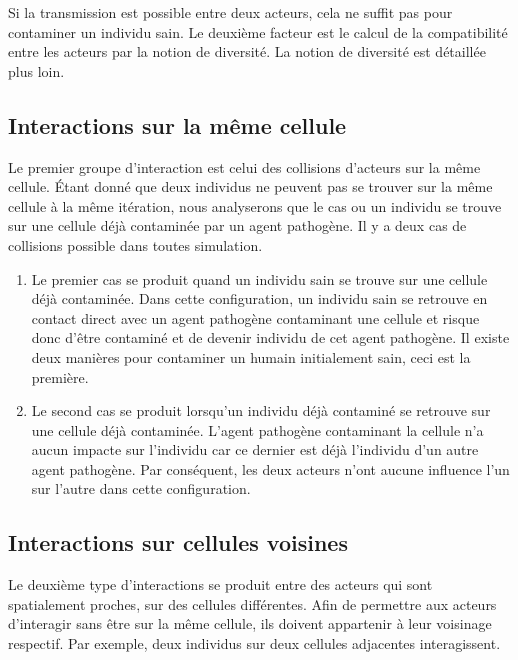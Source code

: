 Si la transmission est possible entre deux acteurs, cela ne suffit pas pour contaminer un individu sain. Le deuxième facteur est le calcul de la compatibilité entre les acteurs par la notion de diversité. La notion de diversité est détaillée plus loin.

\subsection{Interactions sur la même cellule}

Le premier groupe d'interaction est celui des collisions d'acteurs sur la même cellule. Étant donné que deux individus ne peuvent pas se trouver sur la même cellule à la même itération, nous analyserons que le cas ou un individu se trouve sur une cellule déjà contaminée par un agent pathogène. Il y a deux cas de collisions possible dans toutes simulation.

\begin{enumerate}
	\item Le premier cas se produit quand un individu sain se trouve sur une cellule déjà contaminée. Dans cette configuration, un individu sain se retrouve en contact direct avec un agent pathogène contaminant une cellule et risque donc d'être contaminé et de devenir individu de cet agent pathogène. Il existe deux manières pour contaminer un humain initialement sain, ceci est la première.
	\item Le second cas se produit lorsqu'un individu déjà contaminé se retrouve sur une cellule déjà contaminée. L'agent pathogène contaminant la cellule n'a aucun impacte sur l'individu car ce dernier est déjà l'individu d'un autre agent pathogène. Par conséquent, les deux acteurs n'ont aucune influence l'un sur l'autre dans cette configuration.
\end{enumerate}

\subsection{Interactions sur cellules voisines}

Le deuxième type d'interactions se produit entre des acteurs qui sont spatialement proches, sur des cellules différentes. Afin de permettre aux acteurs d'interagir sans être sur la même cellule, ils doivent appartenir à leur voisinage respectif. Par exemple, deux individus sur deux cellules adjacentes interagissent.

